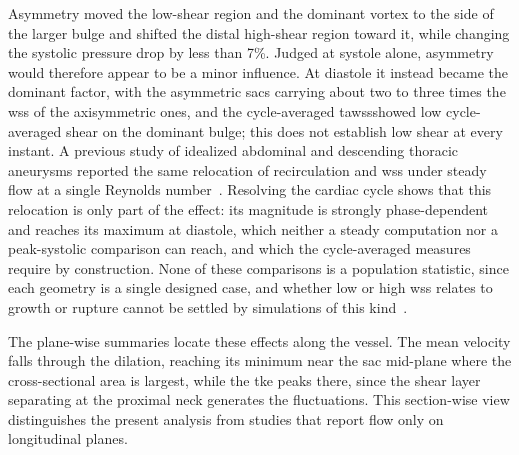 \documentclass[12pt,a4paper]{article}
\newcommand{\cfdrevision}[1]{#1} %
\newcommand{\WSS}{\ac{wss}\xspace}
\newcommand{\TAWSS}{\ac{tawss}\xspace}
\newcommand{\TKE}{\ac{tke}\xspace}
\theoremstyle{definition}
\numberwithin{equation}{section}
\providecommand{\DIFaddtex}[1]{{\protect\color{blue} \sf #1}} %
\providecommand{\DIFdeltex}[1]{{\protect\color{red} \scriptsize #1}} %
\providecommand{\DIFaddbegin}{} %
\providecommand{\DIFaddend}{} %
\providecommand{\DIFdelbegin}{} %
\providecommand{\DIFdelend}{} %
\providecommand{\DIFadd}[1]{\texorpdfstring{\DIFaddtex{#1}}{#1}} %
\providecommand{\DIFdel}[1]{\texorpdfstring{\DIFdeltex{#1}}{}} %
\newcommand{\DIFscaledelfig}{0.5}
\newlength{\DIFdelgraphicswidth} %
\newlength{\DIFdelgraphicsheight} %
\newcommand{\DIFaddincludegraphics}[2][]{{\color{blue}\fbox{\DIFOincludegraphics[#1]{#2}}}} %
\newcommand{\DIFdelincludegraphics}[2][]{%
\sbox{\DIFdelgraphicsbox}{\DIFOincludegraphics[#1]{#2}}%
\settoboxwidth{\DIFdelgraphicswidth}{\DIFdelgraphicsbox} %
\settoboxtotalheight{\DIFdelgraphicsheight}{\DIFdelgraphicsbox} %
\scalebox{\DIFscaledelfig}{%
\parbox[b]{\DIFdelgraphicswidth}{\usebox{\DIFdelgraphicsbox}\\[-\baselineskip] \rule{\DIFdelgraphicswidth}{0em}}\llap{\resizebox{\DIFdelgraphicswidth}{\DIFdelgraphicsheight}{%
\setlength{\unitlength}{\DIFdelgraphicswidth}%
\begin{picture}(1,1)%
\thicklines\linethickness{2pt} %
{\color[rgb]{1,0,0}\put(0,0){\framebox(1,1){}}}%
{\color[rgb]{1,0,0}\put(0,0){\line( 1,1){1}}}%
{\color[rgb]{1,0,0}\put(0,1){\line(1,-1){1}}}%
\end{picture}%
}\hspace*{3pt}}} %
} %
\DeclareRobustCommand{\DIFaddbegin}{\DIFOaddbegin \let\includegraphics\DIFaddincludegraphics} %
\DeclareRobustCommand{\DIFaddend}{\DIFOaddend \let\includegraphics\DIFOincludegraphics} %
\DeclareRobustCommand{\DIFdelbegin}{\DIFOdelbegin \let\includegraphics\DIFdelincludegraphics} %
\DeclareRobustCommand{\DIFdelend}{\DIFOaddend \let\includegraphics\DIFOincludegraphics} %
\renewcommand{\DIFaddtex}[1]{{\protect\color{red}#1}}
\renewcommand{\DIFdeltex}[1]{}
\renewcommand{\DIFdel}[1]{}
\renewcommand{\DIFaddincludegraphics}[2][]{\DIFOincludegraphics[#1]{#2}}
\renewcommand{\DIFdelincludegraphics}[2][]{}
\renewcommand{\cfdrevision}[1]{\textcolor{red}{#1}}
\def\DIFaddbegin{}\def\DIFaddend{}%
\def\DIFdelbegin{}\def\DIFdelend{}%
\def\cfdrevision#1{#1}%
\begin{document}
Asymmetry moved the low-shear region and the dominant vortex to the side of the larger bulge and shifted the distal high-shear region toward it, while changing the systolic pressure drop by less than 7\%. Judged at systole alone, asymmetry would therefore appear to be a minor influence. At diastole it instead became the dominant factor, with the asymmetric sacs carrying about two to three times the \WSS of the axisymmetric ones, and the cycle-averaged \TAWSS \DIFdelbegin \DIFdel{confirmed that the dominant bulge is exposed to low shear throughout the cycle rather than at a single instant. }\DIFdelend \DIFaddbegin \DIFadd{\cfdrevision{showed low cycle-averaged shear on the dominant bulge; this does not establish low shear at every instant.} }\DIFaddend A previous study of idealized abdominal and descending thoracic aneurysms reported the same relocation of recirculation and \WSS under steady flow at a single Reynolds number~\cite{rehman2024comparative}. Resolving the cardiac cycle shows that this relocation is only part of the effect: its magnitude is strongly phase-dependent and reaches its maximum at diastole, which neither a steady computation nor a peak-systolic comparison can reach, and which the cycle-averaged measures require by construction. None of these comparisons is a population statistic, since each geometry is a single designed case, and whether low or high \WSS relates to growth or rupture cannot be settled by simulations of this kind~\cite{geers2017wall,lipp2020computational}.

The plane-wise summaries locate these effects along the vessel. The mean velocity falls through the dilation, reaching its minimum near the sac mid-plane where the cross-sectional area is largest, while the \TKE peaks there, since the shear layer separating at the proximal neck generates the fluctuations. This section-wise view distinguishes the present analysis from studies that report flow only on longitudinal planes.
\end{document}
